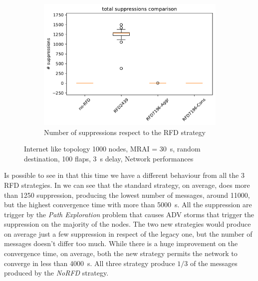 \begin{figure}[h]
\begin{subfigure}[b]{0.325\textwidth}
     \end{subfigure}
     \hfill
     \begin{subfigure}[b]{0.325\textwidth}
         \centering
         \includegraphics[width=\textwidth]{images/RFD/miceVSelephants/elephants/cisco_1000MRAI30_rfd_comparison_suppressions_boxplot.pdf}
         \caption{Number of suppressions respect to the RFD strategy}
         \label{fig:1000_RFD_MRAI_30_suppressions_elephant}
     \end{subfigure}
		\caption{Internet like topology \num{1000} nodes, \ac{MRAI} = \SI{30}{\second}, random destination, \num{100} flaps, \SI{3}{\second} delay, Network performances}
        \label{fig:1000_RFD_MRAI_30_elephant}
\end{figure}

Is possible to see in  that this time we have
a different behaviour from all the \num{3} \ac{RFD} strategies.
In  we can see that
the standard strategy, on average, does more than \num{1250} suppression, producing
the lowest number of messages, around \num{11000}, but the highest convergence
time with more than \SI{5000}{\second}.
All the suppression are trigger by the \textit{Path Exploration} problem that
causes \ac{ADV} storms that trigger the suppression on the majority
of the nodes.
The two new strategies would produce on average just a few suppression in respect
of the legacy one, but the number of messages doesn't differ too much.
While there is a huge improvement on the convergence time, on average,
both the new strategy permits the network to converge in less than \SI{4000}{\second}.
All three strategy produce $1/3$ of the messages produced by the
\textit{NoRFD} strategy.

